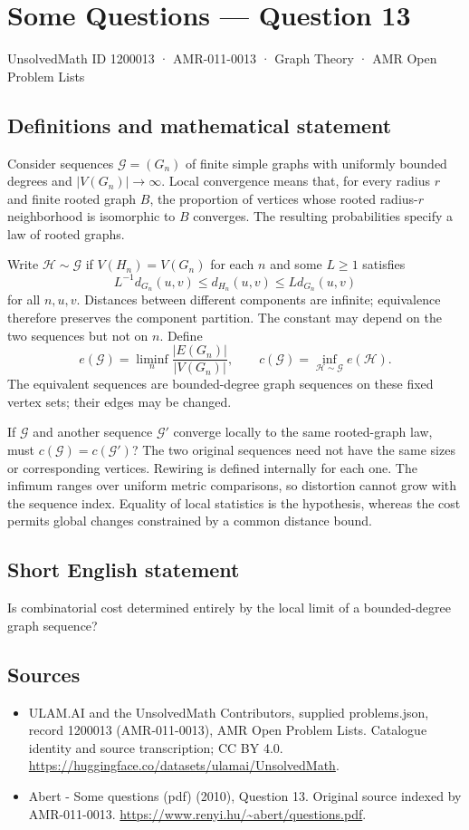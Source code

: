 \documentclass[11pt,a4paper]{article}
\begin{document}
\section*{Some Questions — Question 13}\label{1200013}
{\small UnsolvedMath ID 1200013 · AMR-011-0013 · Graph Theory · AMR Open Problem Lists}
\subsection{Definitions and mathematical statement}
Consider sequences $\mathcal G=(G_n)$ of finite simple graphs with uniformly bounded degrees and $|V(G_n)|\to\infty$. Local convergence means that, for every radius $r$ and finite rooted graph $B$, the proportion of vertices whose rooted radius-$r$ neighborhood is isomorphic to $B$ converges. The resulting probabilities specify a law of rooted graphs.

Write $\mathcal H\sim\mathcal G$ if $V(H_n)=V(G_n)$ for each $n$ and some $L\geq1$ satisfies
\[
 L^{-1}d_{G_n}(u,v)\leq d_{H_n}(u,v)\leq Ld_{G_n}(u,v)
\]
for all $n,u,v$. Distances between different components are infinite; equivalence therefore preserves the component partition. The constant may depend on the two sequences but not on $n$. Define
\[
 e(\mathcal G)=\liminf_n\frac{|E(G_n)|}{|V(G_n)|},
 \qquad c(\mathcal G)=\inf_{\mathcal H\sim\mathcal G}e(\mathcal H).
\]
The equivalent sequences are bounded-degree graph sequences on these fixed vertex sets; their edges may be changed.

If $\mathcal G$ and another sequence $\mathcal G'$ converge locally to the same rooted-graph law, must $c(\mathcal G)=c(\mathcal G')$? The two original sequences need not have the same sizes or corresponding vertices. Rewiring is defined internally for each one. The infimum ranges over uniform metric comparisons, so distortion cannot grow with the sequence index. Equality of local statistics is the hypothesis, whereas the cost permits global changes constrained by a common distance bound.
\subsection{Short English statement}
Is combinatorial cost determined entirely by the local limit of a bounded-degree graph sequence?
\subsection{Sources}
\begin{itemize}
\item[S1] ULAM.AI and the UnsolvedMath Contributors, supplied problems.json, record 1200013 (AMR-011-0013), AMR Open Problem Lists. Catalogue identity and source transcription; CC BY 4.0.
\url{https://huggingface.co/datasets/ulamai/UnsolvedMath}.
\item[S2] Abert - Some questions (pdf) (2010), Question 13. Original source indexed by AMR-011-0013.
\url{https://www.renyi.hu/~abert/questions.pdf}.
\end{itemize}
\end{document}
